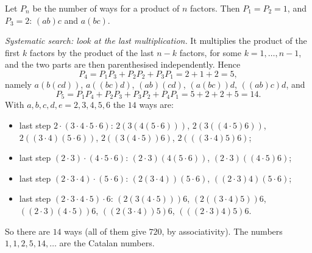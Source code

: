 Let $P_n$ be the number of ways for a product of $n$ factors. Then $P_1=P_2=1$, and $P_3=2$: $(ab)c$ and $a(bc)$.

\emph{Systematic search: look at the last multiplication.} It multiplies the product of the first $k$ factors by the product of the last $n-k$ factors, for some $k=1,\dots,n-1$, and the two parts are then parenthesised independently. Hence
\[
P_4=P_1P_3+P_2P_2+P_3P_1=2+1+2=5,
\]
namely $a(b(cd))$, $a((bc)d)$, $(ab)(cd)$, $(a(bc))d$, $((ab)c)d$, and
\[
P_5=P_1P_4+P_2P_3+P_3P_2+P_4P_1=5+2+2+5=14 .
\]
With $a,b,c,d,e=2,3,4,5,6$ the $14$ ways are:
\begin{itemize}
\item last step $2\cdot(3\cdot4\cdot5\cdot6)$: $2(3(4(5\cdot6)))$, $2(3((4\cdot5)6))$, $2((3\cdot4)(5\cdot6))$, $2((3(4\cdot5))6)$, $2(((3\cdot4)5)6)$;
\item last step $(2\cdot3)\cdot(4\cdot5\cdot6)$: $(2\cdot3)(4(5\cdot6))$, $(2\cdot3)((4\cdot5)6)$;
\item last step $(2\cdot3\cdot4)\cdot(5\cdot6)$: $(2(3\cdot4))(5\cdot6)$, $((2\cdot3)4)(5\cdot6)$;
\item last step $(2\cdot3\cdot4\cdot5)\cdot6$: $(2(3(4\cdot5)))6$, $(2((3\cdot4)5))6$, $((2\cdot3)(4\cdot5))6$, $((2(3\cdot4))5)6$, $(((2\cdot3)4)5)6$.
\end{itemize}
So there are $\boxed{14}$ ways (all of them give $720$, by associativity). The numbers $1,1,2,5,14,\dots$ are the Catalan numbers.
